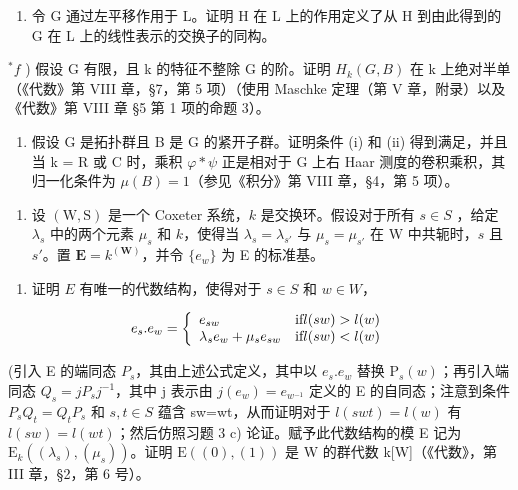 \begin{enumerate}
\def\labelenumi{\alph{enumi})}
\setcounter{enumi}{4}
\tightlist
\item
  令 G 通过左平移作用于 L。证明 H 在 L 上的作用定义了从 H 到由此得到的 G 在 L 上的线性表示的交换子的同构。
\end{enumerate}

\(^{*}f\) ) 假设 G 有限，且 k 的特征不整除 G 的阶。证明 \(H_{k}(G,B)\) 在 k 上绝对半单（《代数》第 VIII 章，§7，第 5 项）（使用 Maschke 定理（第 V 章，附录）以及《代数》第 VIII 章 §5 第 1 项的命题 3）。

\begin{enumerate}
\def\labelenumi{\alph{enumi})}
\setcounter{enumi}{6}
\tightlist
\item
  假设 G 是拓扑群且 B 是 G 的紧开子群。证明条件 (i) 和 (ii) 得到满足，并且当 k = R 或 C 时，乘积 \(\varphi * \psi\) 正是相对于 G 上右 Haar 测度的卷积乘积，其归一化条件为 \(\mu(B) = 1\)（参见《积分》第 VIII 章，§4，第 5 项）。
\end{enumerate}
\relax{}
\begin{enumerate}
\def\labelenumi{\arabic{enumi})}
\setcounter{enumi}{22}
\tightlist
\item
  设 \((\mathrm{W},\mathrm{S})\) 是一个 Coxeter 系统，\(k\) 是交换环。假设对于所有 \(s\in S\) ，给定 \(\lambda_{s}\) 中的两个元素 \(\mu_s\) 和 \(k\)，使得当 \(\lambda_{s} = \lambda_{s'}\) 与 \(\mu_{s} = \mu_{s'}\) 在 W 中共轭时，\(s\) 且 \(s'\)。置 \(\mathbf{E} = k^{(\mathbf{W})}\)，并令 \(\{e_w\}\) 为 E 的标准基。
\end{enumerate}

\begin{enumerate}
\def\labelenumi{\alph{enumi})}
\tightlist
\item
  证明 \(E\) 有唯一的代数结构，使得对于 \(s \in S\) 和 \(w \in W\)，
\end{enumerate}

\[
e _ {s}. e _ {w} = \left\{ \begin{array}{l l} e _ {s w} & \text {if} l (s w) > l (w) \\ \lambda_ {s} e _ {w} + \mu_ {s} e _ {s w} & \text {if} l (s w) <   l (w) \end{array} \right.
\]

(引入 E 的端同态 \(P_{s}\)，其由上述公式定义，其中以 \(e_{s}.e_{w}\) 替换 \(\mathrm{P}_{s}(w)\)；再引入端同态 \(Q_{s}=jP_{s}j^{-1}\)，其中 j 表示由 \(j(e_{w})=e_{w^{-1}}\) 定义的 E 的自同态；注意到条件 \(P_{s}Q_{t}=Q_{t}P_{s}\) 和 \(s,t\in S\) 蕴含 sw=wt，从而证明对于 \(l(swt)=l(w)\) 有 \(l(sw)=l(wt)\)；然后仿照习题 3 c) 论证。赋予此代数结构的模 E 记为 \(\mathrm{E}_{k}((\lambda_{s}),(\mu_{s}))\)。证明 \(\mathrm{E}((0),(1))\) 是 W 的群代数 k{[}W{]}（《代数》，第 III 章，§2，第 6 号）。

